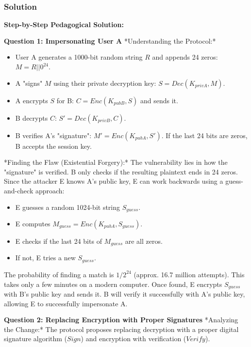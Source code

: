 \documentclass{article}
\begin{document}
\subsubsection*{Solution}
\textbf{Step-by-Step Pedagogical Solution:}

\textbf{Question 1: Impersonating User A}
*Understanding the Protocol:*
\begin{itemize}
    \item[\textbf{1.}] User A generates a 1000-bit random string $R$ and appends 24 zeros: $M = R || 0^{24}$.
    \item[\textbf{2.}] A "signs" $M$ using their private decryption key: $S = Dec(K_{privA}, M)$.
    \item[\textbf{3.}] A encrypts $S$ for B: $C = Enc(K_{pubB}, S)$ and sends it.
    \item[\textbf{4.}] B decrypts $C$: $S' = Dec(K_{privB}, C)$.
    \item[\textbf{5.}] B verifies A's "signature": $M' = Enc(K_{pubA}, S')$. If the last 24 bits are zeros, B accepts the session key.

\end{itemize}
*Finding the Flaw (Existential Forgery):*
The vulnerability lies in how the "signature" is verified. B only checks if the resulting plaintext ends in 24 zeros. Since the attacker E knows A's public key, E can work backwards using a guess-and-check approach:
\begin{itemize}
    \item[\textbf{1.}] E guesses a random 1024-bit string $S_{guess}$.
    \item[\textbf{2.}] E computes $M_{guess} = Enc(K_{pubA}, S_{guess})$.
    \item[\textbf{3.}] E checks if the last 24 bits of $M_{guess}$ are all zeros.
    \item[\textbf{4.}] If not, E tries a new $S_{guess}$.

\end{itemize}
The probability of finding a match is $1 / 2^{24}$ (approx. 16.7 million attempts). This takes only a few minutes on a modern computer. Once found, E encrypts $S_{guess}$ with B's public key and sends it. B will verify it successfully with A's public key, allowing E to successfully impersonate A.

\textbf{Question 2: Replacing Encryption with Proper Signatures}
*Analyzing the Change:*
The protocol proposes replacing decryption with a proper digital signature algorithm ($Sign$) and encryption with verification ($Verify$).
\end{document}
